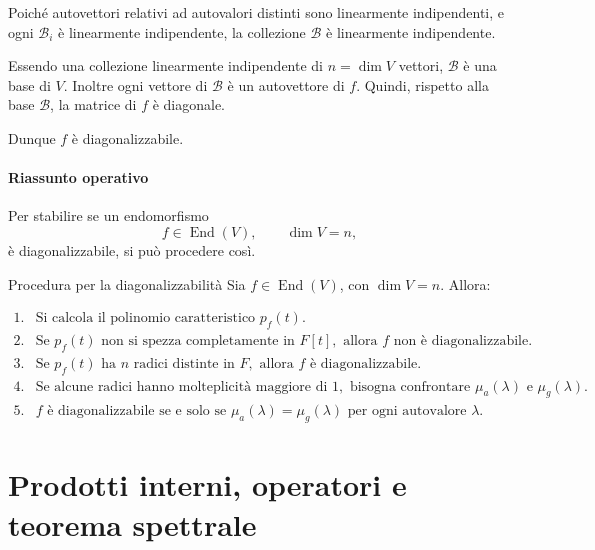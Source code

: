 \documentclass[a4paper]{article}
\begin{document}
\begin{snippetproof}{}
\begin{iffproof}
        Poiché autovettori relativi ad autovalori distinti sono linearmente indipendenti, e ogni \(\mathcal{B}_i\) è linearmente indipendente, la collezione \(\mathcal{B}\) è linearmente indipendente.

        Essendo una collezione linearmente indipendente di \(n=\dim V\) vettori, \(\mathcal{B}\) è una base di \(V\). Inoltre ogni vettore di \(\mathcal{B}\) è un autovettore di \(f\). Quindi, rispetto alla base \(\mathcal{B}\), la matrice di \(f\) è diagonale.

        Dunque \(f\) è diagonalizzabile.
    \end{iffproof}
\end{snippetproof}

\subsection{Riassunto operativo}

Per stabilire se un endomorfismo
\[
    f\in\operatorname{End}(V),
    \qquad
    \dim V=n,
\]
è diagonalizzabile, si può procedere così.

\begin{snippetproposition}{Procedura per la diagonalizzabilità}
    Sia \(f\in\operatorname{End}(V)\), con \(\dim V=n\). Allora:

    \[
        \begin{array}{ll}
            \text{1.} &
            \text{Si calcola il polinomio caratteristico } p_f(t).\\[1mm]
            \text{2.} &
            \text{Se } p_f(t) \text{ non si spezza completamente in } F[t],
            \text{ allora } f \text{ non è diagonalizzabile.}\\[1mm]
            \text{3.} &
            \text{Se } p_f(t) \text{ ha } n \text{ radici distinte in } F,
            \text{ allora } f \text{ è diagonalizzabile.}\\[1mm]
            \text{4.} &
            \text{Se alcune radici hanno molteplicità maggiore di }1,
            \text{ bisogna confrontare } \mu_a(\lambda) \text{ e } \mu_g(\lambda).\\[1mm]
            \text{5.} &
            f \text{ è diagonalizzabile se e solo se }
            \mu_a(\lambda)=\mu_g(\lambda)
            \text{ per ogni autovalore } \lambda.
        \end{array}
    \]
\end{snippetproposition}

\part{Prodotti interni, operatori e teorema spettrale}
\end{document}
